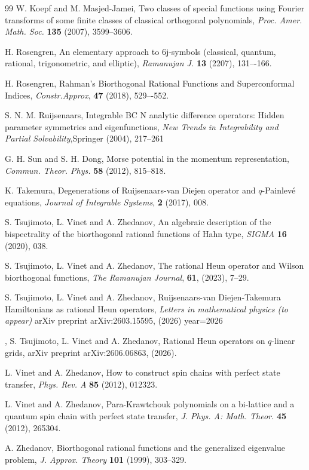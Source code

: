 \documentclass[11pt,reqno]{amsart}
\numberwithin{equation}{section}
\begin{document}
\begin{thebibliography}{99}
W. Koepf and M. Masjed-Jamei,
Two classes of special functions using Fourier transforms of some finite classes of classical orthogonal polynomials,
\emph{Proc. Amer. Math. Soc.} \textbf{135} (2007), 3599--3606.



H. Rosengren, An elementary approach to 6j-symbols (classical, quantum, rational, trigonometric, and elliptic), \emph{Ramanujan J.} \textbf{13} (2207), 131–-166. 

 H. Rosengren, Rahman’s Biorthogonal Rational Functions and Superconformal Indices, \emph{Constr.Approx}, \textbf{47} (2018), 529–-552.

S. N. M. Ruijsenaars, 
Integrable BC N analytic difference operators: Hidden parameter symmetries and eigenfunctions,
\emph{New Trends in Integrability and Partial Solvability},Springer (2004), 217--261



G. H. Sun and S. H. Dong,
Morse potential in the momentum representation,
\emph{Commun. Theor. Phys.} \textbf{58} (2012), 815--818.

K. Takemura, 
 Degenerations of {R}uijsenaars-van {D}iejen operator and $q$-{P}ainlev{\'e} equations,
\emph{Journal of Integrable Systems}, 
\textbf{2} (2017), 008.



S. Tsujimoto, L. Vinet and A. Zhedanov,
An algebraic description of the bispectrality of the biorthogonal rational functions of Hahn type,
\emph{SIGMA} \textbf{16} (2020), 038.

S. Tsujimoto, L. Vinet and A. Zhedanov,
The rational Heun operator and Wilson biorthogonal functions,
 \emph{The Ramanujan Journal},
\textbf{61}, (2023),
 7--29.

 S. Tsujimoto, L. Vinet and A. Zhedanov,
 Ruijsenaars-van Diejen-Takemura Hamiltonians as rational Heun operators,
\emph{Letters in mathematical physics (to appear)}
arXiv preprint arXiv:2603.15595, (2026)
  year={2026}


,
S. Tsujimoto, L. Vinet and A. Zhedanov,
Rational Heun operators on $ q $-linear grids,
arXiv preprint arXiv:2606.06863, (2026).






L. Vinet and A. Zhedanov,
How to construct spin chains with perfect state transfer,
\emph{Phys. Rev. A} \textbf{85} (2012), 012323.

L. Vinet and A. Zhedanov,
Para-Krawtchouk polynomials on a bi-lattice and a quantum spin chain with perfect state transfer,
\emph{J. Phys. A: Math. Theor.} \textbf{45} (2012), 265304.

A. Zhedanov,
Biorthogonal rational functions and the generalized eigenvalue problem,
\emph{J. Approx. Theory} \textbf{101} (1999), 303--329.

\end{thebibliography}
\end{document}
